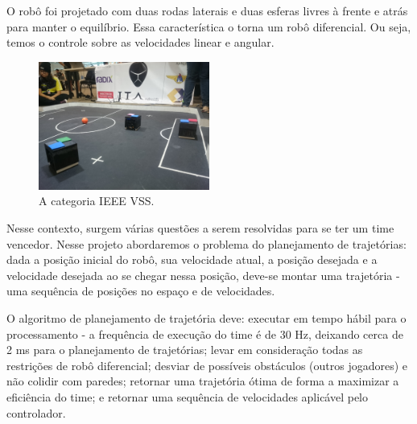 \documentclass[a4paper,12pt]{article}
\begin{document}
O robô foi projetado com duas rodas laterais e duas esferas livres à frente e atrás para manter o equilíbrio. Essa característica o torna um robô diferencial. Ou seja, temos o controle sobre as velocidades linear e angular.

\begin{figure}
	\label{fig: vss}
	\centering
	\includegraphics[width=0.5\textwidth]{figures/vss.JPG}
   \caption{A categoria IEEE VSS.}
\end{figure}

Nesse contexto, surgem várias questões a serem resolvidas para se ter um time vencedor. Nesse projeto abordaremos o problema do planejamento de trajetórias: dada a posição inicial do robô, sua velocidade atual, a posição desejada e a velocidade desejada ao se chegar nessa posição, deve-se montar uma trajetória - uma sequência de posições no espaço e de velocidades.

O algoritmo de planejamento de trajetória deve: executar em tempo hábil para o processamento - a frequência de execução do time é de 30 Hz, deixando cerca de 2 ms para o planejamento de trajetórias; levar em consideração todas as restrições de robô diferencial; desviar de possíveis obstáculos (outros jogadores) e não colidir com paredes; retornar uma trajetória ótima de forma a maximizar a eficiência do time; e retornar uma sequência de velocidades aplicável pelo controlador.

\end{document}
